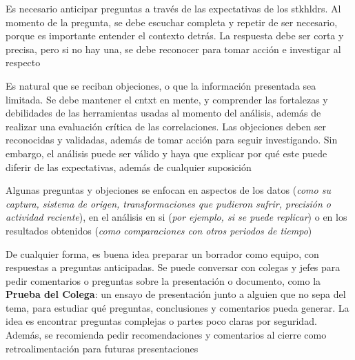 Es necesario anticipar preguntas a través de las expectativas de los \gls{stkhldrs}. Al momento de la pregunta, se debe escuchar completa y repetir de ser necesario, porque es importante entender el contexto detrás. La respuesta debe ser corta y precisa, pero si no hay una, se debe reconocer para tomar acción e investigar al respecto

Es natural que se reciban objeciones, o que la información presentada sea limitada. Se debe mantener el \gls{cntxt} en mente, y comprender las fortalezas y debilidades de las herramientas usadas al momento del análisis, además de realizar una evaluación crítica de las correlaciones. Las objeciones deben ser reconocidas y validadas, además de tomar acción para seguir investigando. Sin embargo, el análisis puede ser válido y haya que explicar por qué este puede diferir de las expectativas, además de cualquier suposición

Algunas preguntas y objeciones se enfocan en aspectos de los datos (\textit{como su captura, sistema de origen, transformaciones que pudieron sufrir, precisión o actividad reciente}), en el análisis en si (\textit{por ejemplo, si se puede replicar}) o en los resultados obtenidos (\textit{como comparaciones con otros periodos de tiempo})

De cualquier forma, es buena idea preparar un borrador como equipo, con respuestas a preguntas anticipadas. Se puede conversar con colegas y jefes para pedir comentarios o preguntas sobre la presentación o documento, como la \textbf{Prueba del Colega}: un ensayo de presentación junto a alguien que no sepa del tema, para estudiar qué preguntas, conclusiones y comentarios pueda generar. La idea es encontrar preguntas complejas o partes poco claras por seguridad. Además, se recomienda pedir recomendaciones y comentarios al cierre como retroalimentación para futuras presentaciones

\newpage